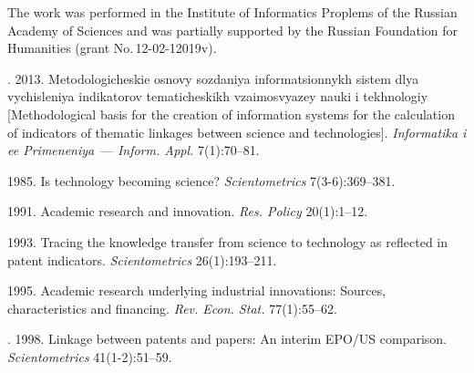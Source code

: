 

\Ack
\noindent
The work was performed in the Institute of Informatics Proplems of
the Russian Academy of Sciences and was partially supported by the
Russian Foundation for Humanities (grant No.\,12-02-12019v).


\vspace*{9pt}

  \begin{multicols}{2}

\renewcommand{\bibname}{\protect\rmfamily References}



{\small\frenchspacing
{%
\begin{thebibliography}{99}

. 2013.
Metodologicheskie osnovy so\-zda\-niya informatsionnykh sistem dlya vychisleniya
indikatorov tematicheskikh vzaimosvyazey nauki i tekhnologiy [Methodological basis
for the creation of information systems for the calculation of indicators of thematic
linkages between science and technologies]. \textit{Informatika i ee Primeneniya}~---
\textit{Inform. Appl.} 7(1):70--81.

 1985. Is technology becoming science?
\textit{Scientometrics} 7(3-6):369--381.

 1991. Academic research and innovation. \textit{Res. Policy}
20(1):1--12.

 1993. Tracing the knowledge transfer from science to technology
as reflected in patent indicators. \textit{Scientometrics} 26(1):193--211.

 1995. Academic research underlying industrial innovations:
Sources, characteristics and financing. \textit{Rev. Econ. Stat.}
77(1):55--62.


. 1998. Linkage between patents and papers: An
interim EPO/US comparison. \textit{Scientometrics} 41(1-2):51--59.


\end{thebibliography}}}
\end{multicols}

